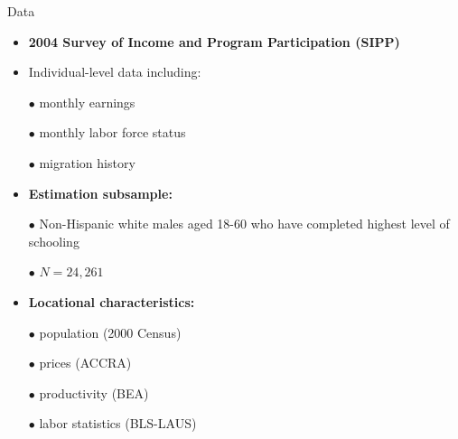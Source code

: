\documentclass[english,final,t]{beamer}
\begin{document}
\begin{frame}{}
\begin{part}{}
\begin{columns}[t]
\begin{column}{.22\linewidth}
      \begin{block}{Data}
        \begin{itemize}
				\item \textbf{2004 Survey of Income and Program Participation (SIPP)}
				\item Individual-level data including:
				\item[$\bullet$] monthly earnings
				\item[$\bullet$] monthly labor force status
				\item[$\bullet$] migration history
				\vspace{3ex}
				\item \textbf{Estimation subsample:}
        \item[$\bullet$] Non-Hispanic white males aged 18-60 who have completed highest level of schooling
				\item[$\bullet$] $N=24,261$
				\vspace{3ex}
        \item \textbf{Locational characteristics:}
        \item[$\bullet$] population (2000 Census)
				\item[$\bullet$] prices (ACCRA)
				\item[$\bullet$] productivity (BEA)
				\item[$\bullet$] labor statistics (BLS-LAUS)
        \end{itemize}
      \end{block}
    \end{column}

			

\end{columns}
\end{part}
\end{frame}
\end{document}
